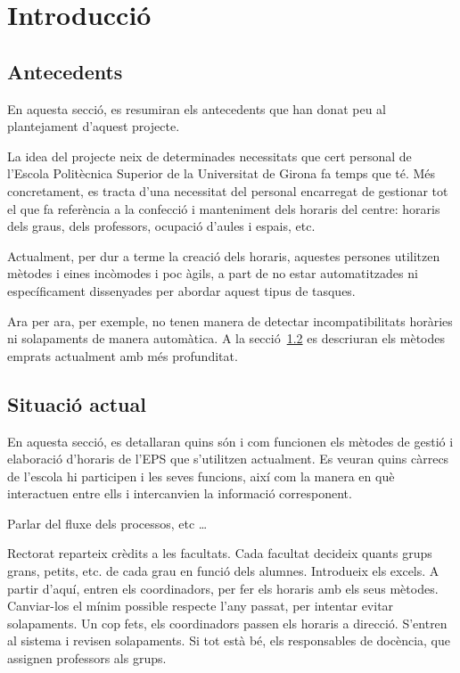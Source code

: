 \documentclass[a4paper,12pt]{ThesisStyle}
\begin{document}


\mainmatter

\chapter{Introducció}
\label{cap:intro}

\section{Antecedents}
\label{sec:antecedents}

En aquesta secció, es resumiran els antecedents que han donat peu al plantejament d'aquest projecte.

La idea del projecte neix de determinades necessitats que cert personal de l'Escola Politècnica Superior de la Universitat de Girona fa temps que
té. Més concretament, es tracta d'una necessitat del personal encarregat de gestionar tot el que fa referència a la confecció i manteniment dels horaris del
centre: horaris dels graus, dels professors, ocupació d'aules i espais, etc.

Actualment, per dur a terme la creació dels horaris, aquestes persones utilitzen mètodes i eines incòmodes i poc àgils, a part de no estar automatitzades
ni específicament dissenyades per abordar aquest tipus de tasques.

Ara per ara, per exemple, no tenen manera de detectar incompatibilitats horàries ni solapaments de manera automàtica. A la secció~\ref{sec:situacio_actual} es
descriuran els mètodes emprats actualment amb més profunditat.

\section{Situació actual}
\label{sec:situacio_actual}

En aquesta secció, es detallaran quins són i com funcionen els mètodes de gestió i elaboració d'horaris de l'EPS que s'utilitzen actualment. Es veuran quins càrrecs
de l'escola hi participen i les seves funcions, així com la manera en què interactuen entre ells i intercanvien la informació corresponent.

Parlar del fluxe dels processos, etc \ldots

Rectorat reparteix crèdits a les facultats. Cada facultat decideix quants grups grans, petits, etc. de cada grau en funció dels alumnes. Introdueix els excels.
A partir d'aquí, entren els coordinadors, per fer els horaris amb els seus mètodes. Canviar-los el mínim possible respecte l'any passat, per intentar evitar
solapaments. Un cop fets, els coordinadors passen els horaris a direcció. S'entren al sistema i revisen solapaments. Si tot està bé, els responsables de docència,
que assignen professors als grups. 
\end{document}
